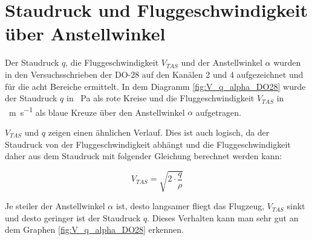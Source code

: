 \section{Staudruck und Fluggeschwindigkeit über Anstellwinkel}
Der Staudruck $q$, die Fluggeschwindigkeit $V_{TAS}$ und der Anstellwinkel $\alpha$ wurden in den Versuchsschrieben der DO-28 auf den Kanälen 2 und 4 aufgezeichnet und für die acht Bereiche ermittelt. In dem Diagramm \ref{fig:V_q_alpha_DO28} wurde der Staudruck $q$ in \SI{}{\pascal} als rote Kreise und die Fluggeschwindigkeit $V_{TAS}$ in \SI{}{\meter \per \second} als blaue Kreuze über den Anstellwinkel $\alpha$ aufgetragen.

$V_{TAS}$ und $q$ zeigen einen ähnlichen Verlauf. Dies ist auch logisch, da der Staudruck von der Fluggeschwindigkeit abhängt und die Fluggeschwindigkeit daher aus dem Staudruck mit folgender Gleichung berechnet werden kann:

\begin{equation}
V_{TAS} = \sqrt{2 \cdot \frac{q}{\rho}}
\end{equation}

Je steiler der Anstellwinkel $\alpha$ ist, desto langsamer fliegt das Flugzeug, $V_{TAS}$ sinkt und desto geringer ist der Staudruck $q$. Dieses Verhalten kann man sehr gut an dem Graphen \ref{fig:V_q_alpha_DO28} erkennen. 
